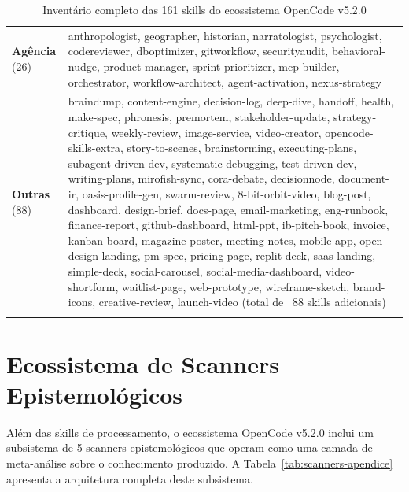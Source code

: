 \begin{longtable}{p{4cm}p{11cm}}
\textbf{Agência} (26) & 
anthropologist, geographer, historian, narratologist, psychologist, codereviewer, dboptimizer, gitworkflow, securityaudit, behavioral-nudge, product-manager, sprint-prioritizer, mcp-builder, orchestrator, workflow-architect, agent-activation, nexus-strategy \\
\addlinespace

\textbf{Outras} (88) & 
braindump, content-engine, decision-log, deep-dive, handoff, health, make-spec, phronesis, premortem, stakeholder-update, strategy-critique, weekly-review, image-service, video-creator, opencode-skills-extra, story-to-scenes, brainstorming, executing-plans, subagent-driven-dev, systematic-debugging, test-driven-dev, writing-plans, mirofish-sync, cora-debate, decisionnode, document-ir, oasis-profile-gen, swarm-review, 8-bit-orbit-video, blog-post, dashboard, design-brief, docs-page, email-marketing, eng-runbook, finance-report, github-dashboard, html-ppt, ib-pitch-book, invoice, kanban-board, magazine-poster, meeting-notes, mobile-app, open-design-landing, pm-spec, pricing-page, replit-deck, saas-landing, simple-deck, social-carousel, social-media-dashboard, video-shortform, waitlist-page, web-prototype, wireframe-sketch, brand-icons, creative-review, launch-video (total de ~88 skills adicionais) \\
\bottomrule
\caption{Inventário completo das 161 skills do ecossistema OpenCode v5.2.0}
\label{tab:skills-inventory}
\end{longtable}

\section{Ecossistema de Scanners Epistemológicos}

Além das skills de processamento, o ecossistema OpenCode v5.2.0 inclui um subsistema de 5 scanners epistemológicos que operam como uma camada de meta-análise sobre o conhecimento produzido. A Tabela~\ref{tab:scanners-apendice} apresenta a arquitetura completa deste subsistema.

